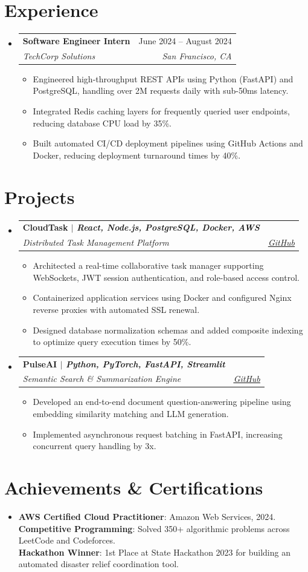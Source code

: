 \documentclass[letterpaper,10pt]{article}
\makeatletter
\newcommand{\resumeItem}[1]{
  \item{
    {#1 \vspace{-2pt}}
  }
}
\newcommand{\resumeSubheading}[4]{
  \vspace{-1pt}\item
    \begin{tabular*}{0.97\textwidth}[t]{l@{\extracolsep{\fill}}r}
      \textbf{#1} & #2 \\
      \textit{#3} & \textit{#4} \\
    \end{tabular*}\vspace{-6pt}
}
\newcommand{\resumeSubHeadingListStart}{\begin{itemize}[leftmargin=0.15in, label={}]}
\newcommand{\resumeSubHeadingListEnd}{\end{itemize}}
\newcommand{\resumeItemListStart}{\begin{itemize}}
\newcommand{\resumeItemListEnd}{\end{itemize}\vspace{-5pt}}
\makeatother
\begin{document}
\section{Experience}
  \resumeSubHeadingListStart
    \resumeSubheading
      {Software Engineer Intern}{June 2024 -- August 2024}
      {TechCorp Solutions}{San Francisco, CA}
      \resumeItemListStart
        \resumeItem{Engineered high-throughput REST APIs using Python (FastAPI) and PostgreSQL, handling over 2M requests daily with sub-50ms latency.}
        \resumeItem{Integrated Redis caching layers for frequently queried user endpoints, reducing database CPU load by 35\%.}
        \resumeItem{Built automated CI/CD deployment pipelines using GitHub Actions and Docker, reducing deployment turnaround times by 40\%.}
      \resumeItemListEnd
  \resumeSubHeadingListEnd

\section{Projects}
    \resumeSubHeadingListStart
      \resumeSubheading
        {\textbf{CloudTask} $|$ \emph{React, Node.js, PostgreSQL, Docker, AWS}}{}
        {Distributed Task Management Platform}{\href{https://github.com/example/cloudtask}{\underline{GitHub}}}
        \resumeItemListStart
          \resumeItem{Architected a real-time collaborative task manager supporting WebSockets, JWT session authentication, and role-based access control.}
          \resumeItem{Containerized application services using Docker and configured Nginx reverse proxies with automated SSL renewal.}
          \resumeItem{Designed database normalization schemas and added composite indexing to optimize query execution times by 50\%.}
        \resumeItemListEnd

      \resumeSubheading
        {\textbf{PulseAI} $|$ \emph{Python, PyTorch, FastAPI, Streamlit}}{}
        {Semantic Search \& Summarization Engine}{\href{https://github.com/example/pulseai}{\underline{GitHub}}}
        \resumeItemListStart
          \resumeItem{Developed an end-to-end document question-answering pipeline using embedding similarity matching and LLM generation.}
          \resumeItem{Implemented asynchronous request batching in FastAPI, increasing concurrent query handling by 3x.}
        \resumeItemListEnd
    \resumeSubHeadingListEnd

\section{Achievements \& Certifications}
 \begin{itemize}[leftmargin=0.15in, label={}]
    \item{
     \textbf{AWS Certified Cloud Practitioner}{: Amazon Web Services, 2024.} \\
     \textbf{Competitive Programming}{: Solved 350+ algorithmic problems across LeetCode and Codeforces.} \\
     \textbf{Hackathon Winner}{: 1st Place at State Hackathon 2023 for building an automated disaster relief coordination tool.}
    }
 \end{itemize}
\end{document}
